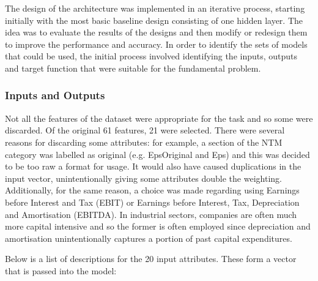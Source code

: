 \documentclass[10pt,onecolumn,letterpaper]{article}
\begin{document}
The design of the architecture was implemented in an iterative process, starting initially with the most basic baseline design consisting of one hidden layer. The idea was to evaluate the results of the designs and then modify or redesign them to improve the performance and accuracy. In order to identify the sets of models that could be used, the initial process involved identifying the inputs, outputs and target function that were suitable for the fundamental problem.

\subsubsection{Inputs and Outputs}

Not all the features of the dataset were appropriate for the task and so some were discarded. Of the original 61 features, 21 were selected. There were several reasons for discarding some attributes: for example, a section of the NTM category was labelled as original (e.g. EpsOriginal and Eps) and this was decided to be too raw a format for usage. It would also have caused duplications in the input vector, unintentionally giving some attributes double the weighting. Additionally, for the same reason, a choice was made regarding using Earnings before Interest and Tax (EBIT) or Earnings before Interest, Tax, Depreciation and Amortisation (EBITDA). In industrial sectors, companies are often much more capital intensive and so the former is often employed since depreciation and amortisation unintentionally captures a portion of past capital expenditures.

Below is a list of descriptions for the 20 input attributes. These form a vector that is passed into the model: 
\end{document}
